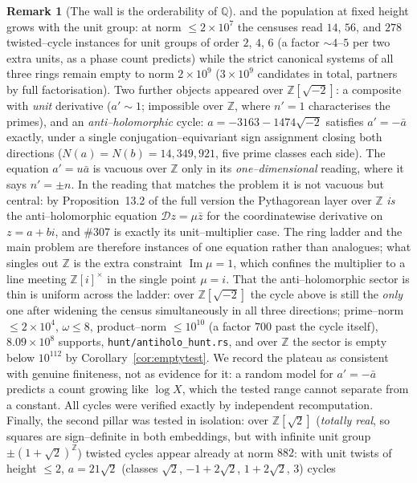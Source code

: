\documentclass[11pt]{article}
\theoremstyle{definition}
\newtheorem{remark}[theorem]{Remark}
\begin{document}
\begin{remark}[The wall is the orderability of $\mathbb{Q}$]
and the population at fixed height grows with the unit group: at norm $\le2\times10^7$ the censuses
read $14$, $56$, and $278$ twisted--cycle instances for unit groups of order $2$, $4$, $6$ (a factor
${\sim}4$--$5$ per two extra units, as a phase count predicts) while the strict canonical systems of
all three rings remain empty to norm $2\times10^9$ ($3\times10^9$ candidates in total, partners by full
factorisation). Two further objects appeared over $\mathbb{Z}[\sqrt{-2}]$: a composite with \emph{unit}
derivative ($a'\sim1$; impossible over $\mathbb{Z}$, where $n'=1$ characterises the primes), and an
\emph{anti--holomorphic} cycle: $a=-3163-1474\sqrt{-2}$ satisfies $a'=-\bar a$ exactly, under a single
conjugation--equivariant sign assignment closing both directions ($N(a)=N(b)=14{,}349{,}921$, five prime
classes each side). The equation $a'=u\bar a$ is vacuous over $\mathbb{Z}$ only in its
\emph{one--dimensional} reading, where it says $n'=\pm n$. In the reading that matches the problem it is
not vacuous but central: by Proposition~13.2 of the full version the Pythagorean layer over $\mathbb{Z}$
\emph{is} the anti--holomorphic equation $\mathcal{D}z=\mu\bar z$ for the coordinatewise derivative on
$z=a+bi$, and \#307 is exactly its unit--multiplier case. The ring ladder and the main problem are
therefore instances of one equation rather than analogues; what singles out $\mathbb{Z}$ is the extra
constraint $\operatorname{Im}\mu=1$, which confines the multiplier to a line meeting
$\mathbb{Z}[i]^{\times}$ in the single point $\mu=i$. That the anti--holomorphic sector is thin is
uniform across the ladder: over $\mathbb{Z}[\sqrt{-2}]$ the cycle above is still the \emph{only} one
after widening the census simultaneously in all three directions; prime--norm $\le2\times10^4$,
$\omega\le8$, product--norm $\le10^{10}$ (a factor $700$ past the cycle itself), $8.09\times10^8$
supports, \texttt{hunt/antiholo\_hunt.rs}, and over
$\mathbb{Z}$ the sector is empty below $10^{112}$ by Corollary~\ref{cor:emptytest}. We record the
plateau as consistent with genuine finiteness, not as evidence for it: a random model for
$a'=-\bar a$ predicts a count growing like $\log X$, which the tested range cannot separate from a
constant. All cycles were verified exactly by independent recomputation. Finally, the second pillar was tested in isolation: over
$\mathbb{Z}[\sqrt2]$ (\emph{totally real}, so squares are sign--definite in both embeddings, but with
infinite unit group $\pm(1+\sqrt2)^{\mathbb{Z}}$) twisted cycles appear already at norm $882$: with
unit twists of height $\le2$, $a=21\sqrt2$ (classes $\sqrt2$, $-1+2\sqrt2$, $1+2\sqrt2$, $3$) cycles

\end{remark}
\end{document}
